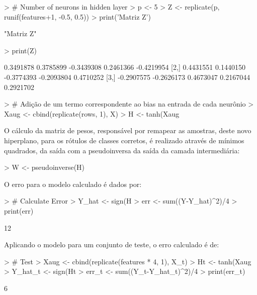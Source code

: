\documentclass{article}
\begin{document}
\begin{Schunk}
\begin{Sinput}
> # Number of neurons in hidden layer
> p <- 5
> Z <- replicate(p, runif(features+1, -0.5, 0.5))
> print('Matriz Z')
\end{Sinput}
\begin{Soutput}
[1] "Matriz Z"
\end{Soutput}
\begin{Sinput}
> print(Z)
\end{Sinput}
\begin{Soutput}
           [,1]       [,2]       [,3]       [,4]       [,5]
[1,]  0.3491878  0.3785899 -0.3439308  0.2461366 -0.4219954
[2,]  0.4431551  0.1440150 -0.3774393 -0.2093804  0.4710252
[3,] -0.2907575 -0.2626173  0.4673047  0.2167044  0.2921702
\end{Soutput}
\begin{Sinput}
> # Adição de um termo correspondente ao bias na entrada de cada neurônio
> Xaug <- cbind(replicate(rows, 1), X)
> H <- tanh(Xaug %*% Z)
\end{Sinput}
\end{Schunk}

O cálculo da matriz de pesos, responsável por remapear as amostras, deste novo hiperplano, para os rótulos de classes corretos, é realizado através de mínimos quadrados, da saída com a pseudoinversa da saída da camada intermediária:

\begin{Schunk}
\begin{Sinput}
> W <- pseudoinverse(H) %*% Y
\end{Sinput}
\end{Schunk}

O erro para o modelo calculado é dados por:

\begin{Schunk}
\begin{Sinput}
> # Calculate Error
> Y_hat <- sign(H %*% W)
> err <- sum((Y-Y_hat)^2)/4
> print(err)
\end{Sinput}
\begin{Soutput}
[1] 12
\end{Soutput}
\end{Schunk}

Aplicando o modelo para um conjunto de teste, o erro calculado é de:

\begin{Schunk}
\begin{Sinput}
> # Test
> Xaug <- cbind(replicate(features * 4, 1), X_t)
> Ht <- tanh(Xaug %*% Z)
> Y_hat_t <- sign(Ht %*% W)
> err_t <- sum((Y_t-Y_hat_t)^2)/4
> print(err_t)
\end{Sinput}
\begin{Soutput}
[1] 6
\end{Soutput}
\end{Schunk}
\end{document}
